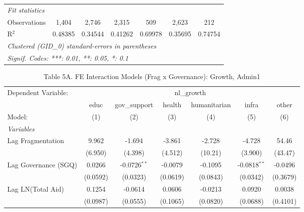\begin{tabular}{lcccccc}
   \midrule
   \emph{Fit statistics}\\
   Observations                       & 1,404    & 2,746          & 2,315         & 509          & 2,623          & 212\\  
   R$^2$                              & 0.48385  & 0.34544        & 0.41262       & 0.69978      & 0.35695        & 0.74754\\  
   \midrule \midrule
   \multicolumn{7}{l}{\emph{Clustered (GID\_0) standard-errors in parentheses}}\\
   \multicolumn{7}{l}{\emph{Signif. Codes: ***: 0.01, **: 0.05, *: 0.1}}\\
\end{tabular}
\par\endgroup



\begin{table}[H]
   \caption{Table 5A. FE Interaction Models (Frag x Governance): Growth, Admin1}
   \centering
   \begin{tabular}{lcccccc}
      \tabularnewline \midrule \midrule
      Dependent Variable: & \multicolumn{6}{c}{nl\_growth}\\
                                         & educ     & gov\_support   & health        & humanitarian & infra          & other \\   
      Model:                             & (1)      & (2)            & (3)           & (4)          & (5)            & (6)\\  
      \midrule
      \emph{Variables}\\
      Lag Fragmentation                  & 9.962    & -1.694         & -3.861        & -2.728       & -4.728         & 54.46\\   
                                         & (6.950)  & (4.398)        & (4.512)       & (10.21)      & (3.900)        & (43.47)\\   
      Lag Governance (SGQ)               & 0.0266   & -0.0726$^{**}$ & -0.0079       & -0.1095      & -0.0818$^{**}$ & -0.0496\\   
                                         & (0.0592) & (0.0323)       & (0.0619)      & (0.0843)     & (0.0342)       & (0.3679)\\   
      Lag LN(Total Aid)                  & 0.1254   & -0.0614        & 0.0606        & -0.0213      & 0.0920         & 0.0038\\   
                                         & (0.0987) & (0.0555)       & (0.1065)      & (0.0820)     & (0.0688)       & (0.4101)\\   

\end{tabular}
\end{table}
